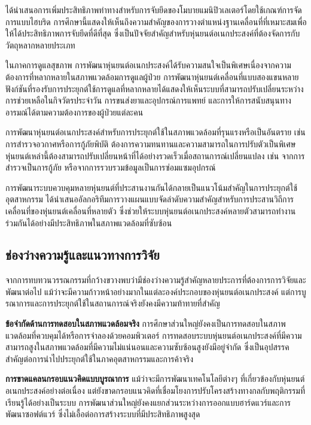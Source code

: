 \documentclass[a4paper]{article}
\begin{document}
\textcite{xie2024pose} ได้นำเสนอการเพิ่มประสิทธิภาพท่าทางสำหรับการจับยึดของโมบายแมนิปิวเลเตอร์โดยใช้เกณฑ์การจัดการแบบไฮบริด การศึกษานี้แสดงให้เห็นถึงความสำคัญของการวางตำแหน่งฐานเคลื่อนที่ที่เหมาะสมเพื่อให้ได้ประสิทธิภาพการจับยึดที่ดีที่สุด ซึ่งเป็นปัจจัยสำคัญสำหรับหุ่นยนต์อเนกประสงค์ที่ต้องจัดการกับวัตถุหลากหลายประเภท

ในภาคการดูแลสุขภาพ การพัฒนาหุ่นยนต์อเนกประสงค์ได้รับความสนใจเป็นพิเศษเนื่องจากความต้องการที่หลากหลายในสภาพแวดล้อมการดูแลผู้ป่วย การพัฒนาหุ่นยนต์เคลื่อนที่แบบสองแขนหลายฟังก์ชันที่รองรับการประยุกต์ใช้การดูแลที่หลากหลายได้แสดงให้เห็นระบบที่สามารถปรับเปลี่ยนระหว่างการช่วยเหลือในกิจวัตรประจำวัน การขนส่งยาและอุปกรณ์การแพทย์ และการให้การสนับสนุนทางอารมณ์ได้ตามความต้องการของผู้ป่วยแต่ละคน

การพัฒนาหุ่นยนต์อเนกประสงค์สำหรับการประยุกต์ใช้ในสภาพแวดล้อมที่รุนแรงหรือเป็นอันตราย เช่น การสำรวจอวกาศหรือการกู้ภัยพิบัติ ต้องการความทนทานและความสามารถในการปรับตัวเป็นพิเศษ หุ่นยนต์เหล่านี้ต้องสามารถปรับเปลี่ยนหน้าที่ได้อย่างรวดเร็วเมื่อสถานการณ์เปลี่ยนแปลง เช่น จากการสำรวจเป็นการกู้ภัย หรือจากการรวบรวมข้อมูลเป็นการซ่อมแซมอุปกรณ์

การพัฒนาระบบควบคุมหลายหุ่นยนต์ที่ประสานงานกันได้กลายเป็นแนวโน้มสำคัญในการประยุกต์ใช้อุตสาหกรรม \textcite{ieee2015prioritized} ได้นำเสนออัลกอริทึมการวางแผนแบบจัดลำดับความสำคัญสำหรับการประสานวิถีการเคลื่อนที่ของหุ่นยนต์เคลื่อนที่หลายตัว ซึ่งช่วยให้ระบบหุ่นยนต์อเนกประสงค์หลายตัวสามารถทำงานร่วมกันได้อย่างมีประสิทธิภาพในสภาพแวดล้อมที่ซับซ้อน

\subsection{ช่องว่างความรู้และแนวทางการวิจัย}

จากการทบทวนวรรณกรรมที่กว้างขวางพบว่ามีช่องว่างความรู้สำคัญหลายประการที่ต้องการการวิจัยและพัฒนาต่อไป แม้ว่าจะมีความก้าวหน้าอย่างมากในแต่ละองค์ประกอบของหุ่นยนต์อเนกประสงค์ แต่การบูรณาการและการประยุกต์ใช้ในสถานการณ์จริงยังคงมีความท้าทายที่สำคัญ

\textbf{ข้อจำกัดด้านการทดสอบในสภาพแวดล้อมจริง} การศึกษาส่วนใหญ่ยังคงเป็นการทดสอบในสภาพแวดล้อมที่ควบคุมได้หรือการจำลองด้วยคอมพิวเตอร์ การทดสอบระบบหุ่นยนต์อเนกประสงค์ที่มีความสามารถสูงในสภาพแวดล้อมที่มีความไม่แน่นอนและความซับซ้อนสูงยังมีอยู่จำกัด ซึ่งเป็นอุปสรรคสำคัญต่อการนำไปประยุกต์ใช้ในภาคอุตสาหกรรมและการค้าจริง

\textbf{การขาดแคลนกรอบแนวคิดแบบบูรณาการ} แม้ว่าจะมีการพัฒนาเทคโนโลยีต่างๆ ที่เกี่ยวข้องกับหุ่นยนต์อเนกประสงค์อย่างต่อเนื่อง แต่ยังขาดกรอบแนวคิดที่เชื่อมโยงการปรับโครงสร้างทางกลกับพฤติกรรมที่เรียนรู้ได้อย่างเป็นระบบ การพัฒนาส่วนใหญ่ยังคงแยกส่วนระหว่างการออกแบบฮาร์ดแวร์และการพัฒนาซอฟต์แวร์ ซึ่งไม่เอื้อต่อการสร้างระบบที่มีประสิทธิภาพสูงสุด
\end{document}
